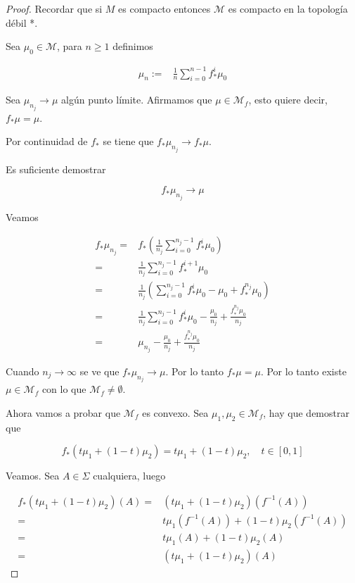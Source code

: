 \begin{proof}
	Recordar que si $M$ es compacto entonces $\mathcal{M}$ es compacto en la topología débil *.
	
	Sea $\mu_0 \in \mathcal{M}$, para $n \geq 1$ definimos
	
	\begin{align}
		\mu_n :=& \frac{1}{n} \sum_{i=0}^{n-1} f_*^i \mu_0
	\end{align}
	
		Sea $\mu_{n_j} \rightarrow \mu$ algún punto límite. Afirmamos que $\mu \in \mathcal{M}_f$, esto quiere decir, $f_*\mu = \mu$.
	
	Por continuidad de $f_*$ se tiene que $f_*\mu_{n_j} \rightarrow f_*\mu$.
	
	Es suficiente demostrar
	
	\begin{equation}
	f_*\mu_{n_j} \rightarrow \mu
	\end{equation}
	
	Veamos
	
	\begin{align}
	f_*\mu_{n_j} =& f_* \left( \frac{1}{n_j} \sum_{i=0}^{n_j-1} f^i_* \mu_0 \right)\\
	=& \frac{1}{n_j} \sum_{i=0}^{n_j-1} f_*^{i+1} \mu_0\\
	=& \frac{1}{n_j} \left( \sum_{i=0}^{n_j-1} f^i_* \mu_0 - \mu_0 + f^{n_j}_* \mu_0 \right)\\
	=& \frac{1}{n_j} \sum_{i=0}^{n_j-1} f^i_* \mu_0 - \frac{\mu_0}{n_j} + \frac{f^{n_j}_* \mu_0}{n_j}\\
	=& \mu_{n_j} - \frac{\mu_0}{n_j} + \frac{f^{n_j}_* \mu_0}{n_j}
	\end{align}
	
	Cuando $n_j \rightarrow \infty$ se ve que $f_* \mu_{n_j} \rightarrow \mu$. Por lo tanto $f_*\mu=\mu$. Por lo tanto existe $\mu \in \mathcal{M}_f$ con lo que $\mathcal{M}_f \neq \emptyset$.
	
	Ahora vamos a probar que $\mathcal{M}_f$ es convexo. Sea $\mu_1,\mu_2 \in \mathcal{M}_f$, hay que demostrar que
	
	\begin{equation}
	f_*(t\mu_1 + (1-t)\mu_2) = t\mu_1 + (1-t)\mu_2, \quad t \in [0,1]
	\end{equation}
	
	Veamos. Sea $A \in \Sigma$ cualquiera, luego 
	
	\begin{align}
	f_*(t\mu_1 + (1-t)\mu_2)(A) =& (t\mu_1 + (1-t)\mu_2)(f^{-1}(A))\\
	=& t\mu_1(f^{-1}(A)) + (1-t)\mu_2(f^{-1}(A))\\
	=& t\mu_1(A) + (1-t)\mu_2(A)\\
	=& (t\mu_1 + (1-t)\mu_2)(A)
	\end{align}
	

\end{proof}
